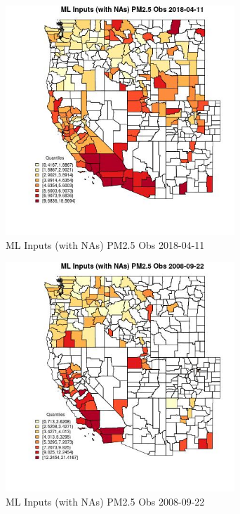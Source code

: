 \clearpage 

\begin{figure} 
\centering  
\includegraphics[width=0.77\textwidth]{Code_Outputs/Report_ML_input_PM25_Step4_part_e_de_duplicated_aves_compiled_2019-05-18wNAs_CountyPM25_ObsMean2018-04-11_2018-04-11.jpg} 
\caption{\label{fig:Report_ML_input_PM25_Step4_part_e_de_duplicated_aves_compiled_2019-05-18wNAsCountyPM25_ObsMean2018-04-11_2018-04-11}ML Inputs (with NAs) PM2.5 Obs 2018-04-11} 
\end{figure} 
 

\begin{figure} 
\centering  
\includegraphics[width=0.77\textwidth]{Code_Outputs/Report_ML_input_PM25_Step4_part_e_de_duplicated_aves_compiled_2019-05-18wNAs_CountyPM25_ObsMean2008-09-22_2008-09-22.jpg} 
\caption{\label{fig:Report_ML_input_PM25_Step4_part_e_de_duplicated_aves_compiled_2019-05-18wNAsCountyPM25_ObsMean2008-09-22_2008-09-22}ML Inputs (with NAs) PM2.5 Obs 2008-09-22} 
\end{figure} 
 

